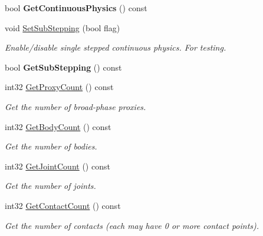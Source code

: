 \begin{DoxyCompactItemize}
bool {\bfseries Get\+Continuous\+Physics} () const
\item 
\mbox{\label{classb2World_ae8aacc78ea4753075067daff51b61778}} 
void \mbox{\hyperlink{classb2World_ae8aacc78ea4753075067daff51b61778}{Set\+Sub\+Stepping}} (bool flag)
\begin{DoxyCompactList}\small\item\em Enable/disable single stepped continuous physics. For testing. \end{DoxyCompactList}\item 
\mbox{\label{classb2World_aa41f23e3e12f82ce229ce644ecdac28b}} 
bool {\bfseries Get\+Sub\+Stepping} () const
\item 
\mbox{\label{classb2World_a088742d580bfc42531790ea8747bb8f8}} 
int32 \mbox{\hyperlink{classb2World_a088742d580bfc42531790ea8747bb8f8}{Get\+Proxy\+Count}} () const
\begin{DoxyCompactList}\small\item\em Get the number of broad-\/phase proxies. \end{DoxyCompactList}\item 
\mbox{\label{classb2World_a41c8b37baf5165c06932e8f08eb758de}} 
int32 \mbox{\hyperlink{classb2World_a41c8b37baf5165c06932e8f08eb758de}{Get\+Body\+Count}} () const
\begin{DoxyCompactList}\small\item\em Get the number of bodies. \end{DoxyCompactList}\item 
\mbox{\label{classb2World_a98bd6ca53dbc376f210beced33901934}} 
int32 \mbox{\hyperlink{classb2World_a98bd6ca53dbc376f210beced33901934}{Get\+Joint\+Count}} () const
\begin{DoxyCompactList}\small\item\em Get the number of joints. \end{DoxyCompactList}\item 
\mbox{\label{classb2World_aa47375fc3ca9f09d0350c61cfeabcee9}} 
int32 \mbox{\hyperlink{classb2World_aa47375fc3ca9f09d0350c61cfeabcee9}{Get\+Contact\+Count}} () const
\begin{DoxyCompactList}\small\item\em Get the number of contacts (each may have 0 or more contact points). \end{DoxyCompactList}\item 

\end{DoxyCompactItemize}
